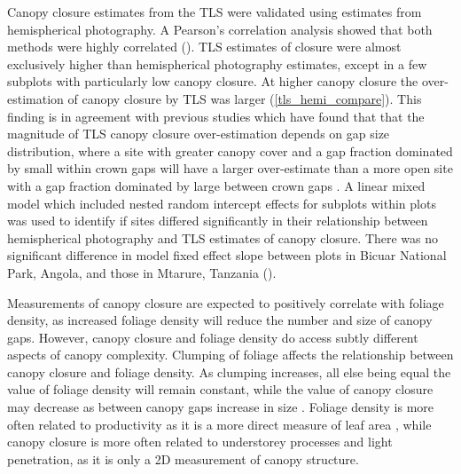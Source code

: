 \documentclass[11pt,a4paper]{article}
\begin{document}
Canopy closure estimates from the TLS were validated using estimates from hemispherical photography. A Pearson's correlation analysis showed that both methods were highly correlated (\hemiCor{}). TLS estimates of closure were almost exclusively higher than hemispherical photography estimates, except in a few subplots with particularly low canopy closure. At higher canopy closure the over-estimation of canopy closure by TLS was larger (\autoref{tls_hemi_compare}). This finding is in agreement with previous studies which have found that that the magnitude of TLS canopy closure over-estimation depends on gap size distribution, where a site with greater canopy cover and a gap fraction dominated by small within crown gaps will have a larger over-estimate than a more open site with a gap fraction dominated by large between crown gaps \citep{Seidel2012}. A linear mixed model which included nested random intercept effects for subplots within plots was used to identify if sites differed significantly in their relationship between hemispherical photography and TLS estimates of canopy closure. There was no significant difference in model fixed effect slope between plots in Bicuar National Park, Angola, and those in Mtarure, Tanzania (\hemiLme{}). 

Measurements of canopy closure are expected to positively correlate with foliage density, as increased foliage density will reduce the number and size of canopy gaps. However, canopy closure and foliage density do access subtly different aspects of canopy complexity. Clumping of foliage affects the relationship between canopy closure and foliage density. As clumping increases, all else being equal the value of foliage density will remain constant, while the value of canopy closure may decrease as between canopy gaps increase in size \citep{Beland2021}. Foliage density is more often related to productivity as it is a more direct measure of leaf area \citep{Seidel2013}, while canopy closure is more often related to understorey processes and light penetration, as it is only a 2D measurement of canopy structure. 
\end{document}
